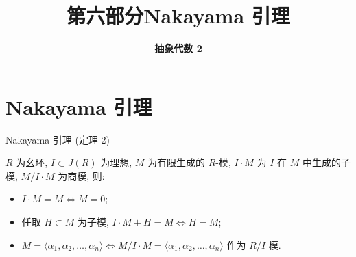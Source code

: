 \everymath{\displaystyle}



\title[第六部分\\
Nakayama 引理]{\texorpdfstring{\LARGE \bfseries 第六部分\quad Nakayama 引理}{第六部分 Nakayama 引理}}
\author[抽象代数 2]{\Large \bfseries 抽象代数 2}
\date{}





\begin{frame}

\titlepage %

\end{frame}


\section[定理]{Nakayama 引理}


\begin{frame}{Nakayama 引理 (定理 2)}

\begin{thm}[Nakayama 引理]
$R$ 为幺环, $I \subset J(R)$ 为理想, $M$ 为有限生成的 $R$-模, $I \cdot M$
为 $I$ 在 $M$ 中生成的子模, $M/I \cdot M$ 为商模, 则:
\begin{itemize}
\item[(i)] $I \cdot M = M \iff M = 0$;
\item[(ii)] 任取 $H \subset M$ 为子模, $I \cdot M + H = M \iff H = M$;
\item[(iii)] $M = \langle \alpha_1, \alpha_2, \dots, \alpha_n \rangle
  \iff M/I \cdot M = \langle \bar{\alpha}_1, \bar{\alpha}_2, \dots,
  \bar{\alpha}_n \rangle$ 作为 $R/I$ 模.
\end{itemize}
\end{thm}

\end{frame}


